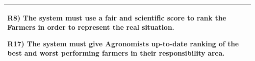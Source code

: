 \documentclass[table, 12pt]{article}
\begin{document}
\begin{itemize}
\begin{longtable}{|p{}|p{}|}
                                                                                       R8) The system must use a fair and scientific score to rank the Farmers in order to represent the real situation.
                                                                                       
                                                                                       R17) The system must give Agronomists up-to-date ranking of the best and worst performing farmers in their responsibility area.\\\hline
                    
        \end{longtable}
    
    \end{itemize}

        \newpage
\end{document}
